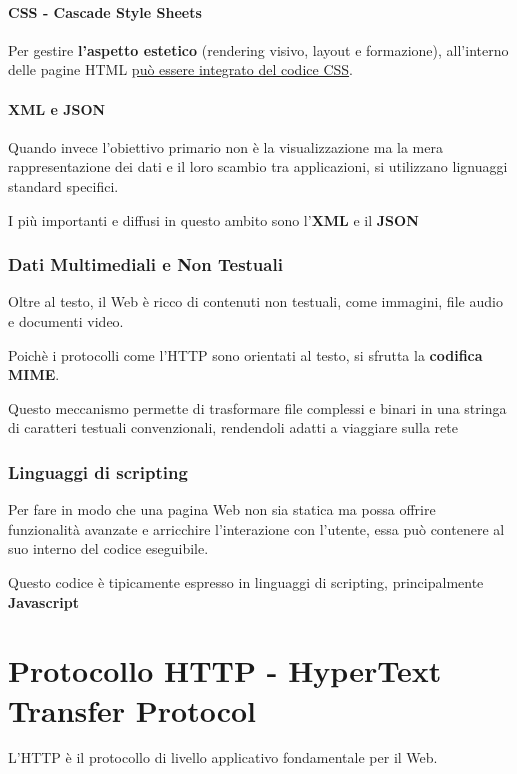 \subsubsection{CSS - Cascade Style Sheets}
Per gestire \textbf{l'aspetto estetico} (rendering visivo, layout e formazione), all'interno delle pagine HTML \uline{può essere integrato del codice CSS}.

\subsubsection{XML e JSON}
Quando invece l'obiettivo primario non è la visualizzazione ma la mera rappresentazione dei dati e il loro scambio tra applicazioni, si utilizzano lignuaggi standard specifici.

I più importanti e diffusi in questo ambito sono l'\textbf{XML} e il \textbf{JSON}

\subsection{Dati Multimediali e Non Testuali}
Oltre al testo, il Web è ricco di contenuti non testuali, come immagini, file audio e documenti video.

Poichè i protocolli come l'HTTP sono orientati al testo, si sfrutta la \textbf{codifica MIME}.

Questo meccanismo permette di trasformare file complessi e binari in una stringa di caratteri testuali convenzionali, rendendoli adatti a viaggiare sulla rete

\subsection{Linguaggi di scripting}
Per fare in modo che una pagina Web non sia statica ma possa offrire funzionalità avanzate e arricchire l'interazione con l'utente, essa può contenere al suo interno del codice eseguibile.

Questo codice è tipicamente espresso in linguaggi di scripting, principalmente \textbf{Javascript}

\newpage

\chapter{Protocollo HTTP - HyperText Transfer Protocol}

L'HTTP è il protocollo di livello applicativo fondamentale per il Web.

